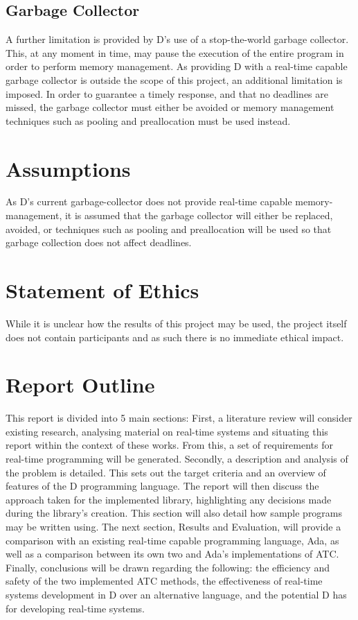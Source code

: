 \subsection{Garbage Collector}
A further limitation is provided by D's use of a stop-the-world garbage collector. 
This, at any moment in time, may pause the execution of the entire program in 
order to perform memory management. As providing D with a real-time capable 
garbage collector is outside the scope of this project, an additional limitation 
is imposed. In order to guarantee a timely response, and that no 
deadlines are missed, the garbage collector must either be avoided or memory 
management techniques such as pooling and preallocation must be used instead. 

\section{Assumptions} 
As D's current garbage-collector does not provide real-time capable
memory-management, it is assumed that the garbage collector will either be replaced, 
avoided, or techniques such as pooling and preallocation will be used so that 
garbage collection does not affect deadlines. 

\section{Statement of Ethics}
While it is unclear how the results of this project may be used, the project 
itself does not contain participants and as such there is no immediate ethical impact.

\section{Report Outline} %
This report is divided into 5 main sections:
First, a literature review will 
consider existing research, analysing material on 
real-time systems and situating this report within the context of these works. 
From this, a set of requirements for real-time programming will be generated. 
Secondly, a description and analysis of the problem is detailed. This sets out 
the target criteria and an overview of features of the D programming 
language. 
The report will then discuss the approach taken for the implemented library, 
highlighting any decisions made during the library's creation. This section will 
also detail how sample programs may be written using.
The next section, Results and Evaluation, will provide a comparison with an 
existing real-time capable programming language, Ada, as well as a comparison 
between its own two and Ada's implementations of ATC. 
Finally, conclusions will be drawn regarding the following: 
the efficiency and safety of the two implemented ATC methods, 
the effectiveness of real-time systems development in D over an alternative language, 
and the potential D has for developing real-time systems.
